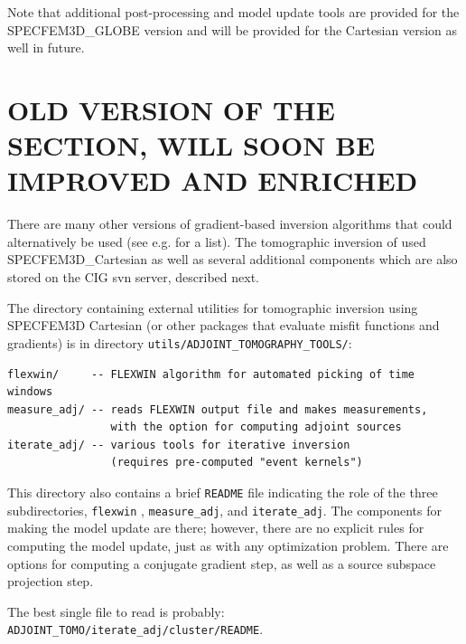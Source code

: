 Note that additional post-processing and model update tools are provided for the SPECFEM3D\_GLOBE version and will be provided for the Cartesian version as well in future.


\section{OLD VERSION OF THE SECTION, WILL SOON BE IMPROVED AND ENRICHED}

There are many other versions of gradient-based inversion
algorithms that could alternatively be used (see e.g. \cite{ViOp09,MoChKoWa15} for a list).
The tomographic inversion of \citet{TaLiMaTr09,TaLiMaTr2010} used SPECFEM3D\_Cartesian as well
as several additional components which are also stored on the CIG
svn server, described next.

The directory containing external utilities for tomographic inversion using
SPECFEM3D Cartesian (or other packages that evaluate misfit functions
and gradients) is in directory \texttt{utils/ADJOINT\_TOMOGRAPHY\_TOOLS/}:
\begin{verbatim}
flexwin/     -- FLEXWIN algorithm for automated picking of time windows
measure_adj/ -- reads FLEXWIN output file and makes measurements,
                with the option for computing adjoint sources
iterate_adj/ -- various tools for iterative inversion
                (requires pre-computed "event kernels")
\end{verbatim}
This directory also contains
a brief \verb+README+ file indicating the role of the three subdirectories,
\verb+flexwin+ \citep{Maggi2009}, \verb+measure_adj+, and \verb+iterate_adj+.
The components for making the model update are there; however, there
are no explicit rules for computing the model update, just as with
any optimization problem. There are options for computing a conjugate
gradient step, as well as a source subspace projection step.

The best single file to read is probably: \verb+ADJOINT_TOMO/iterate_adj/cluster/README+.


